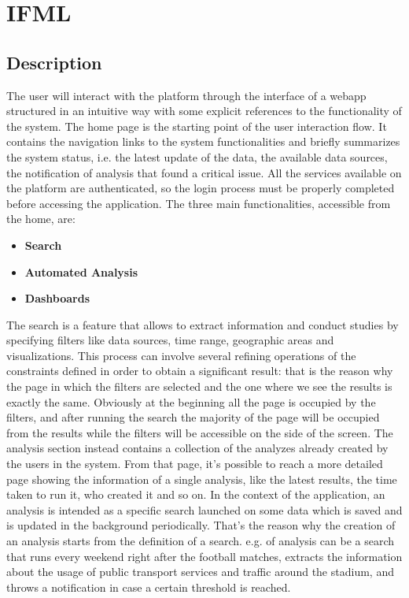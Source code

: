 \documentclass[../main.tex]{subfiles}
\begin{document}
    \chapter{IFML}\label{ch:ifml}
    \section{Description}\label{sec:description}
    The user will interact with the platform through the interface of a webapp structured in an intuitive way with some explicit references to the functionality of the system. The home page is the starting point of the user interaction flow. It contains the navigation links to the system functionalities and briefly summarizes the system status, i.e. the latest update of the data, the available data sources, the notification of analysis that found a critical issue. All the services available on the platform are authenticated, so the login process must be properly completed before accessing  the application.
    The three main functionalities, accessible from the home, are:
    \begin{itemize}
        \item \textbf{Search}
        \item \textbf{Automated Analysis}
        \item \textbf{Dashboards}
    \end{itemize}
    The search is a feature that allows to extract information and conduct studies by specifying filters like data sources, time range, geographic areas and visualizations. This process can involve several refining operations of the constraints defined in order to obtain a significant result: that is the reason why the page in which the filters are selected and the one where we see the results is exactly the same. Obviously at the beginning all the page is occupied by the filters, and after running the search the majority of the page will be occupied from the results while the filters will be accessible on the side of the screen.
    The analysis section instead contains a collection of the analyzes already created by the users in the system. From that page, it’s possible to reach a more detailed page showing the information of a single analysis, like the latest results, the time taken to run it, who created it and so on. In the context of the application, an analysis is intended as a specific search launched on some data which is saved and is updated in the background periodically. That’s the reason why the creation of an analysis starts from the definition of a search. e.g. of analysis can be a search that runs every weekend right after the football matches, extracts the information about the usage of public transport services and traffic around the stadium, and throws a notification in case a certain threshold is reached.
\end{document}
